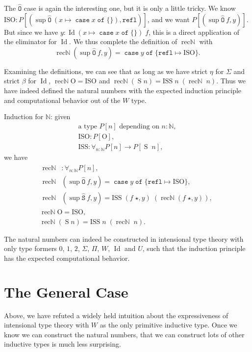 \documentclass[a4paper,UKenglish,cleveref,nameinlink,autoref,thm-restate]{lipics-v2019}
\newcommand{\zero}{0}
\newcommand{\one}{1}
\newcommand{\bool}{2}
\newcommand{\codeO}{\mathtt{\hat{O}}}
\newcommand{\codeS}{\mathtt{\hat{S}}}
\DeclareMathOperator{\supop}{sup}
\renewcommand{\sup}[2]{\supop {#1}\:\!{#2}}
\newcommand{\N}{\hyperref[define-N]{\mathbb{N}}}
\DeclareMathOperator{\case}{\mathtt{case}}
\newcommand{\caset}[2]{\case {#1}\;\mathtt{of}\;\{{#2}\}}
\DeclareMathOperator{\Idop}{\mathrm{Id}}
\newcommand{\Id}[2]{\Idop {#1}\;{#2}}
\newcommand{\refl}{\mathtt{refl}}
\newcommand{\ISO}{\mathrm{ISO}}
\newcommand{\ISS}{\mathrm{ISS}}
\newcommand{\zerO}{\hyperref[define-O]{\mathrm{O}}}
\DeclareMathOperator{\Succ}{\hyperref[define-S]{S}}
\DeclareMathOperator{\recN}{\mathrm{rec\mathbb{N}}}
\begin{document}
The $\codeO$ case is again the interesting one, but it is only a little tricky. We know $\ISO : P[ (\sup{\codeO}{(x\mapsto\caset{x}{})},\refl)]$, and we want $P[(\sup{\codeO}{f},y)]$. But since we have $y : \Id{(x\mapsto\caset{x}{})}{f}$, this is a direct application of the eliminator for $\Idop$.
We thus complete the definition of $\recN$ with
\begin{equation*}\recN (\sup{\codeO}{f},y) = \caset{y}{\refl \mapsto \ISO}.\end{equation*}

Examining the definitions, we can see that as long as we have strict $\eta$ for $\Sigma$ and strict $\beta$ for $\Idop$, $\recN \zerO = \ISO$ and $\recN(\Succ n) = \ISS\;n\;(\recN\;n)$. Thus we have indeed defined the natural numbers with the expected induction principle and computational behavior out of the $W$ type.

\begin{definition}Induction for $\N$: given
\begin{gather}
\text{a type $P[n]$ depending on $n : \N$},\\
\ISO : P[\zerO],\\
\ISS : \forall_{n : \N}P[n] \to P[\Succ\;n],
\end{gather}
we have
\begin{gather}
\begin{aligned}
\recN& : \forall_{n : \N}P[n],\\
\recN& (\sup{\codeO}{f},y) = \caset{y}{\refl \mapsto \ISO},\\
\recN& (\sup{\codeS}{f},y) = \ISS\;(f\;\star, y)\;(\recN(f\;\star, y)),
\end{aligned}\label{define-recN}\\
\recN \zerO = \ISO\label{recN-eqO},\\
\recN(\Succ n) = \ISS\;n\;(\recN\;n)\label{recN-eqS}.
\end{gather}
\end{definition}

\begin{theorem}
    The natural numbers can indeed be constructed in intensional type theory with only type formers $\zero$, $\one$, $\bool$, $\Sigma$, $\Pi$, $W$, $\Idop$ and $U$, such that the induction principle has the expected computational behavior.
\end{theorem}

\section{The General Case}\label{general-case}
Above, we have refuted a widely held intuition about the expressiveness of intensional type theory with $W$ as the only primitive inductive type. Once we know we can construct the natural numbers, that we can construct lots of other inductive types is much less surprising.
\end{document}
